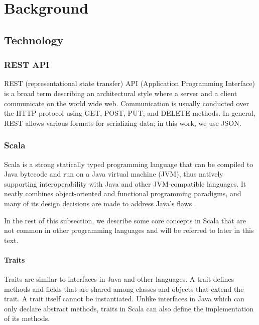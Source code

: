 \chapter{Background}
\label{chap:background}

\section{Technology}

\subsection{REST API}
REST (representational state transfer) API (Application Programming Interface) is a broad term describing an architectural style where a server and a client communicate on the world wide web.
Communication is usually conducted over the HTTP protocol using GET, POST, PUT, and DELETE methods.
In general, REST allows various formats for serializing data; in this work, we use JSON. \cite{Fielding2000}

\subsection{Scala}
Scala is a strong statically typed programming language that can be compiled to Java bytecode and run on a Java virtual machine (JVM), thus natively supporting interoperability with Java and other JVM-compatible languages.
It neatly combines object-oriented and functional programming paradigms, and many of its design decisions are made to address Java's flaws \cite{wampler2014programming}.

In the rest of this subsection, we describe some core concepts in Scala that are not common in other programming languages and will be referred to later in this text.

\subsubsection{Traits}
Traits are similar to interfaces in Java and other languages.
A trait defines methods and fields that are shared among classes and objects that extend the trait.
A trait itself cannot be instantiated.
Unlike interfaces in Java which can only declare abstract methods, traits in Scala can also define the implementation of its methods.

